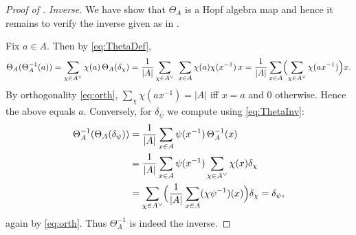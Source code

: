 \documentclass[10pt,a4paper]{amsart}
\begin{document}
\begin{proof}[Proof of ]
\medskip\noindent
{\it Inverse.}
We have show that $\Theta_A$ is a Hopf algebra map and hence it remains to verify the inverse given as in .


Fix $a\in A$. Then by \eqref{eq:ThetaDef},
\[
\Theta_A(\Theta_A^{-1}(a))
=\sum_{\chi\in A^\vee}\chi(a)\,\Theta_A(\delta_\chi)
=\frac1{|A|}\sum_{\chi\in A^\vee}\ \sum_{x\in A}\chi(a)\chi(x^{-1})\,x
=\frac1{|A|}\sum_{x\in A}\Bigl(\sum_{\chi\in A^\vee}\chi(ax^{-1})\Bigr)x.
\]
By orthogonality \eqref{eq:orth}, $\sum_{\chi}\chi(ax^{-1})=|A|$ iff $x=a$ and $0$ otherwise. Hence the above equals $a$.
Conversely, for $\delta_\psi$ we compute using \eqref{eq:ThetaInv}:
\begin{align*}
\Theta_A^{-1}(\Theta_A(\delta_\psi))
& =\frac1{|A|}\sum_{x\in A}\psi(x^{-1})\,\Theta_A^{-1}(x)\\
& =\frac1{|A|}\sum_{x\in A}\psi(x^{-1})\sum_{\chi\in A^\vee}\chi(x)\delta_\chi \\
& =\sum_{\chi\in A^\vee}\Bigl(\frac1{|A|}\sum_{x\in A}(\chi\psi^{-1})(x)\Bigr)\delta_\chi
=\delta_\psi,
\end{align*}
again by \eqref{eq:orth}. Thus $\Theta_A^{-1}$ is indeed the inverse.
\end{proof}
\end{document}
